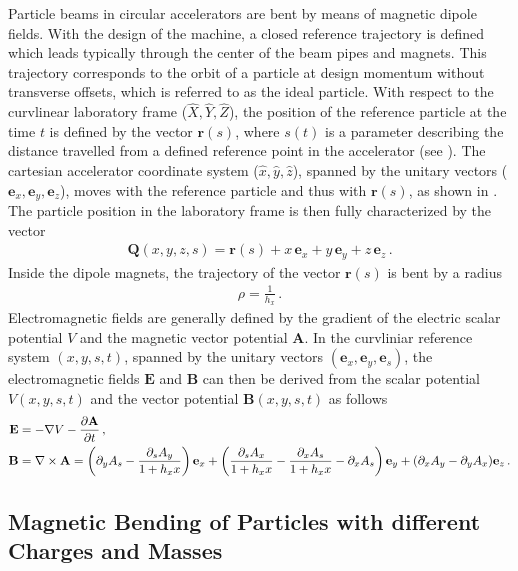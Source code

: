 Particle beams in circular accelerators are bent by means of magnetic dipole fields. With the design of the machine, a closed reference trajectory is defined which leads typically through the center of the beam pipes and magnets. This trajectory corresponds to the orbit of a particle at design momentum without transverse offsets, which is referred to as the ideal particle. With respect to the curvlinear laboratory frame ($\hat X, \hat Y, \hat Z$), the position of the reference particle at the time $t$ is defined by the vector $\textbf{r}(s)$, where $s(t)$ is a parameter describing the distance travelled from a defined reference point in the accelerator (see ). The cartesian accelerator coordinate system ($\hat x, \hat y, \hat z$), spanned by the unitary vectors ($\textbf{e}_x, \textbf{e}_y, \textbf{e}_z$), moves with the reference particle and thus with $\textbf{r}(s)$, as shown in . The particle position in the laboratory frame is then fully characterized by the vector
%
\begin{align}
\textbf{Q}(x,y,z,s) = \textbf{r} (s) + x  \, \textbf{e}_x + y \,  \textbf{e}_y + z \, \textbf{e}_z \, . \label{eq:refframe}
\end{align}
%
Inside the dipole magnets, the trajectory of the vector $\textbf{r}(s)$ is bent by a radius 
\begin{align}
\rho = \frac{1}{h_x} \, .
\end{align}
%
%
Electromagnetic fields are generally defined by the gradient of the electric scalar potential $V$ and the magnetic vector potential $\textbf{A}$. In the curvliniar reference system $(x,y,s,t)$, spanned by the unitary vectors $(\textbf{e}_x,\textbf{e}_y,\textbf{e}_s)$, the electromagnetic fields $\textbf{E}$ and $\textbf{B}$ can then be derived from the scalar potential $V(x,y,s,t)$ and the vector potential $\textbf{B}(x,y,s,t)$ as follows~\cite{wolski2014beam}
\begin{align}
\textbf{E} &= -\nabla V - \frac{\partial \textbf{A}}{\partial t}  \, , \\
\textbf{B} &= \nabla \times \textbf{A} = \left( \partial_y A_s - \frac{\partial_s A_y}{1+h_x x } \right) \textbf{e}_x + \left( \frac{\partial_s A_x}{1+h_x x} - \frac{\partial_x A_s}{1+h_x x}  - \partial_x A_s \right) \textbf{e}_y + (\partial_x A_y - \partial_y A_x) \textbf{e}_z \, .
\end{align}




\subsection{Magnetic Bending of Particles with different Charges and Masses}\label{transverse:ions}

